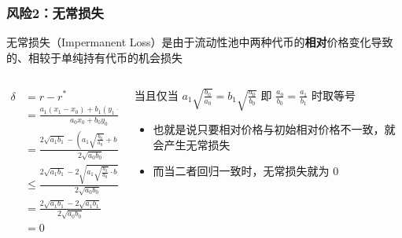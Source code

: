 \documentclass{beamer}
\begin{document}
\begin{frame}
    \frametitle{风险2：无常损失}

    无常损失（Impermanent Loss）是由于流动性池中两种代币的\textbf{相对}价格变化导致的、相较于单纯持有代币的机会损失
    
    \begin{columns}
        \begin{column}{0.6\textwidth}
            \begin{equation}
                \begin{aligned}
                    \delta 
                    & = r - r^*  \\ 
                    & = \frac{a_1(x_1-x_0) + b_1(y_1-y_0)}{a_0x_0 + b_0y_0} \\
                    & = \frac{2\sqrt{a_1b_1} - \left( a_1\sqrt{\frac{b_0}{a_0}} + b_1\sqrt{\frac{a_0}{b_0}} \right)}{2\sqrt{a_0b_0}} \\
                    & \le \frac{2\sqrt{a_1b_1} - 2\sqrt{a_1\sqrt{\frac{b_0}{a_0}} \cdot b_1\sqrt{\frac{a_0}{b_0}}}}{2\sqrt{a_0b_0}} \\
                    & = \frac{2\sqrt{a_1b_1} - 2\sqrt{a_1b_1}}{2\sqrt{a_0b_0}} \\
                    & = 0
                \end{aligned}
            \end{equation}
        \end{column}

        \begin{column}{0.4\textwidth}
            当且仅当 $\displaystyle a_1\sqrt{\frac{b_0}{a_0}} = b_1\sqrt{\frac{a_0}{b_0}}$ 即 $\displaystyle \frac{a_0}{b_0} = \frac{a_1}{b_1}$ 时取等号

            \begin{itemize}
                \item 也就是说只要相对价格与初始相对价格不一致，就会产生无常损失
                \item 而当二者回归一致时，无常损失就为 0 
            \end{itemize}

        \end{column}
    \end{columns}
\end{frame}
\end{document}
